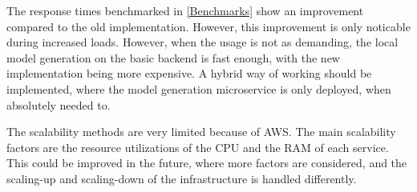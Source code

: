 		The response times benchmarked in \ref{Benchmarks} show an improvement compared to the old implementation. However, this improvement
		is only noticable during increased loads. However, when the usage is not as demanding, the local model generation on the basic backend
		is fast enough, with the new implementation being more expensive. A hybrid way of working should be implemented, where the model generation 
		microservice is only deployed, when absolutely needed to. 

		The scalability methods are very limited because of AWS. The main scalability factors are the resource utilizations
		of the CPU and the RAM of each service. This could be improved in the future, where more factors are considered, and the scaling-up and 
		scaling-down of the infrastructure is handled differently.